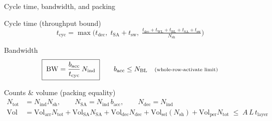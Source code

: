 \documentclass[aspectratio=169,10pt]{beamer}
\newcommand{\Nindep}{N_{\mathrm{ind}}}
\newcommand{\Nshare}{N_{\mathrm{sh}}}
\newcommand{\Ntot}{N_{\mathrm{tot}}}
\newcommand{\Nsa}{N_{\mathrm{SA}}}
\newcommand{\Ndec}{N_{\mathrm{dec}}}
\newcommand{\Nbl}{N_{\mathrm{BL}}}
\newcommand{\tcyc}{t_{\mathrm{cyc}}}
\newcommand{\tdec}{t_{\mathrm{dec}}}
\newcommand{\twl}{t_{\mathrm{WL}}}
\newcommand{\tbl}{t_{\mathrm{BL}}}
\newcommand{\tsa}{t_{\mathrm{SA}}}
\newcommand{\tsw}{t_{\mathrm{sw}}}
\newcommand{\Volarr}{\mathrm{Vol}_{\mathrm{arr}}}
\newcommand{\Volsa}{\mathrm{Vol}_{\mathrm{SA}}}
\newcommand{\Voldec}{\mathrm{Vol}_{\mathrm{dec}}}
\newcommand{\Volsel}{\mathrm{Vol}_{\mathrm{sel}}}
\newcommand{\bacc}{b_{\mathrm{acc}}}
\newcommand{\Volper}{\mathrm{Vol}_{\mathrm{per}}}
\begin{document}
\begin{frame}{Cycle time, bandwidth, and packing}
\footnotesize

\begin{block}{Cycle time (throughput bound)}
\[
  \tcyc = \max\!\Big(
    \tdec,\; \tsa+\tsw,\;
    \tfrac{\tdec+\twl+\tbl+\tsa+\tsw}{\Nshare}
  \Big)
\]
\end{block}

\begin{block}{Bandwidth}
\[
  \boxed{\;\mathrm{BW} = \dfrac{\bacc}{\tcyc}\,\Nindep\;}
  \qquad \bacc \le \Nbl \quad\text{\scriptsize(whole-row-activate limit)}
\]
\end{block}

\begin{block}{Counts \& volume (packing equality)}
\vspace{-1.0ex}
\begin{align*}
  \Ntot &= \Nindep\Nshare, \qquad
  \Nsa = \Nindep\,\bacc, \qquad
  \Ndec = \Nindep \\[0.4ex]
  \mathrm{Vol} &= \Volarr\Ntot + \Volsa\Nsa + \Voldec\Ndec
                 + \Volsel(\Nshare) + \Volper\Ntot
                 \;\le\; A\,L\,t_{\mathrm{layer}}
\end{align*}
\end{block}

\end{frame}
\end{document}
